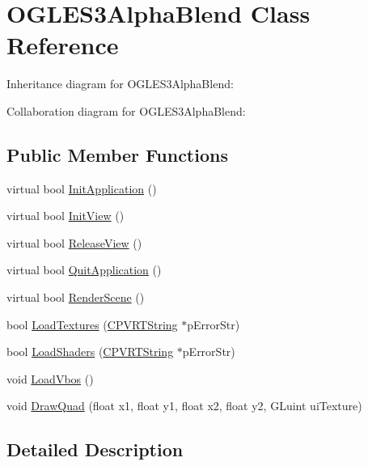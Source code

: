 \hypertarget{class_o_g_l_e_s3_alpha_blend}{\section{O\+G\+L\+E\+S3\+Alpha\+Blend Class Reference}
\label{class_o_g_l_e_s3_alpha_blend}
}


Inheritance diagram for O\+G\+L\+E\+S3\+Alpha\+Blend\+:


Collaboration diagram for O\+G\+L\+E\+S3\+Alpha\+Blend\+:
\subsection*{Public Member Functions}
\begin{DoxyCompactItemize}
\item 
virtual bool \hyperlink{class_o_g_l_e_s3_alpha_blend_aef9178260a613afcfa8539ba3b453b4c}{Init\+Application} ()
\item 
virtual bool \hyperlink{class_o_g_l_e_s3_alpha_blend_ad644c6edb1e7a92a18b7d1608bfcf659}{Init\+View} ()
\item 
virtual bool \hyperlink{class_o_g_l_e_s3_alpha_blend_ade17644f06cef9a122955947aa86f493}{Release\+View} ()
\item 
virtual bool \hyperlink{class_o_g_l_e_s3_alpha_blend_adb3de1183fa3199600f2db872787d87b}{Quit\+Application} ()
\item 
virtual bool \hyperlink{class_o_g_l_e_s3_alpha_blend_a3c3eab828555aaabf30dc1c9a7419f8d}{Render\+Scene} ()
\item 
bool \hyperlink{class_o_g_l_e_s3_alpha_blend_adce7a7902981f230466ceb2f05aa72b4}{Load\+Textures} (\hyperlink{class_c_p_v_r_t_string}{C\+P\+V\+R\+T\+String} $\ast$p\+Error\+Str)
\item 
bool \hyperlink{class_o_g_l_e_s3_alpha_blend_ad9081062b1b253b2b3b2c61a40379a51}{Load\+Shaders} (\hyperlink{class_c_p_v_r_t_string}{C\+P\+V\+R\+T\+String} $\ast$p\+Error\+Str)
\item 
void \hyperlink{class_o_g_l_e_s3_alpha_blend_a2158668d6d407592a00c7f6bafc87699}{Load\+Vbos} ()
\item 
void \hyperlink{class_o_g_l_e_s3_alpha_blend_acc63567c187033a8eeeebc7e9bd51126}{Draw\+Quad} (float x1, float y1, float x2, float y2, G\+Luint ui\+Texture)
\end{DoxyCompactItemize}


\subsection{Detailed Description}


